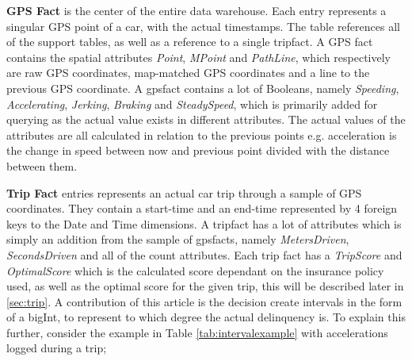 \textbf{GPS Fact} is the center of the entire data warehouse. Each entry represents a singular GPS point of a car, with the actual timestamps. The table references all of the support tables, as well as a reference to a single tripfact. A GPS fact contains the spatial attributes \textit{Point}, \textit{MPoint} and \textit{PathLine}, which respectively are raw GPS coordinates, map-matched GPS coordinates and a line to the previous GPS coordinate. A gpsfact contains a lot of Booleans, namely \textit{Speeding}, \textit{Accelerating}, \textit{Jerking}, \textit{Braking} and \textit{SteadySpeed}, which is primarily added for querying as the actual value exists in different attributes. The actual values of the attributes are all calculated in relation to the previous points e.g. acceleration is the change in speed between now and previous point divided with the distance between them.

\textbf{Trip Fact} entries represents an actual car trip through a sample of GPS coordinates. They contain a start-time and an end-time represented by 4 foreign keys to the Date and Time dimensions. A tripfact has a lot of attributes which is simply an addition from the sample of gpsfacts, namely \textit{MetersDriven}, \textit{SecondsDriven} and all of the count attributes. Each trip fact has a \textit{TripScore} and \textit{OptimalScore} which is the calculated score dependant on the insurance policy used, as well as the optimal score for the given trip, this will be described later in \ref{sec:trip}. A contribution of this article is the decision create intervals in the form of a bigInt, to represent to which degree the actual delinquency is. To explain this further, consider the example in Table \ref{tab:intervalexample} with accelerations logged during a trip; 

